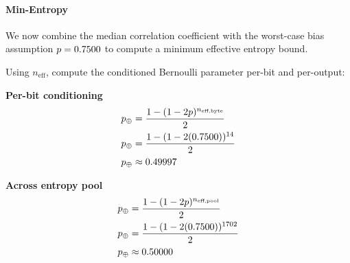 \documentclass[titlepage]{report}
\begin{document}
	\paragraph{Min-Entropy}
	\label{ssec:min_entropy}
		We now combine the median correlation coefficient with the worst-case bias assumption $p=0.7500$ to compute a minimum effective entropy bound.
		
		Using $n_{\text{eff}}$, compute the conditioned Bernoulli parameter per-bit and per-output:
	\begingroup
	\setlength{\abovedisplayskip}{4pt}
	\setlength{\abovedisplayshortskip}{4pt}
	\setlength{\belowdisplayskip}{4pt}
	\setlength{\belowdisplayshortskip}{4pt}
	\vspace{-0.35em}
		\begin{center}
			\begin{minipage}[t]{0.48\textwidth}
				\vspace{0pt}
				\textbf{Per-bit conditioning}
				\begin{align*}
					p_{\oplus}&=\frac{1-(1-2p)^{n_{\text{eff,byte}}}}{2} \\
					p_{\oplus}&=\frac{1-(1-2(0.7500))^{14}}{2} \\
					p_{\oplus}&\approx 0.49997
				\end{align*}
			\end{minipage}\hfill
			\begin{minipage}[t]{0.48\textwidth}
				\vspace{0pt}
				\textbf{Across entropy pool}
				\begin{align*}
					p_{\oplus}&=\frac{1-(1-2p)^{n_{\text{eff,pool}}}}{2} \\
					p_{\oplus}&=\frac{1-(1-2(0.7500))^{1702}}{2} \\
					p_{\oplus}&\approx 0.50000
				\end{align*}
			\end{minipage}
		\end{center}
		\vspace{-0.35em}
		\endgroup
	
\end{document}
